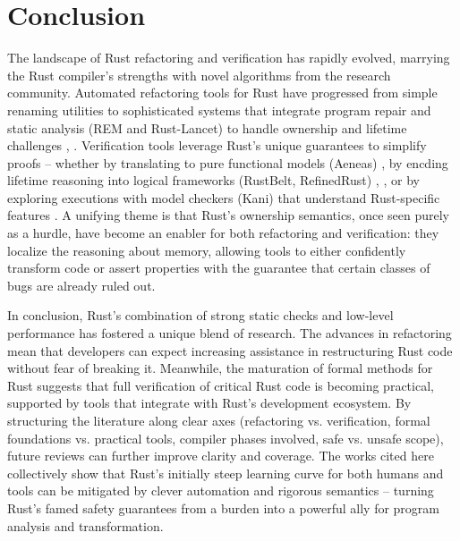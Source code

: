\section{Conclusion} %
\label{sec:lit_concusions}
The landscape of Rust refactoring and verification has rapidly evolved, marrying
the Rust compiler’s strengths with novel algorithms from the research community.
Automated refactoring tools for Rust have progressed from simple renaming
utilities to sophisticated systems that integrate program repair and static
analysis (REM and Rust-Lancet) to handle ownership and lifetime challenges
\cite{AdventureOfALifetime}, \cite{RustLancet}. Verification tools leverage
Rust’s unique guarantees to simplify proofs – whether by translating to pure
functional models (Aeneas) \cite{AENEAS}, by encding lifetime reasoning into
logical frameworks (RustBelt, RefinedRust) \cite{RustBelt}, \cite{RefinedRust},
or by exploring executions with model checkers (Kani) that understand
Rust-specific features \cite{verifying_dynamic_trait_objects}. A unifying theme
is that Rust’s ownership semantics, once seen purely as a hurdle, have become an
enabler for both refactoring and verification: they localize the reasoning about
memory, allowing tools to either confidently transform code or assert properties
with the guarantee that certain classes of bugs are already ruled out.

In conclusion, Rust’s combination of strong static checks and low-level
performance has fostered a unique blend of research. The advances in refactoring
mean that developers can expect increasing assistance in restructuring Rust code
without fear of breaking it. Meanwhile, the maturation of formal methods for
Rust suggests that full verification of critical Rust code is becoming
practical, supported by tools that integrate with Rust’s development ecosystem.
By structuring the literature along clear axes (refactoring vs. verification,
formal foundations vs. practical tools, compiler phases involved, safe vs.
unsafe scope), future reviews can further improve clarity and coverage. The
works cited here collectively show that Rust’s initially steep learning curve
for both humans and tools can be mitigated by clever automation and rigorous
semantics – turning Rust’s famed safety guarantees from a burden into a powerful
ally for program analysis and transformation.

\renewcommand\thefigure{\thechapter .\arabic{figure}}
